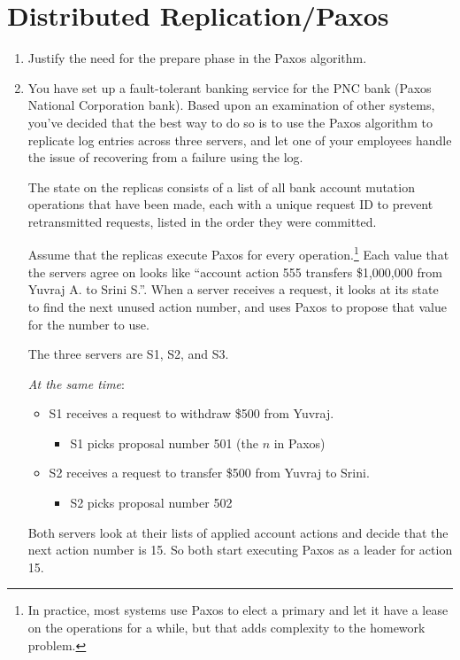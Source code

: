 \documentclass{article}
\begin{document}
\section{Distributed Replication/Paxos}
\begin{enumerate}
\item Justify the need for the prepare phase in the Paxos algorithm.
\item You have set up a fault-tolerant banking service for the PNC bank (Paxos National Corporation bank).  Based upon an examination of other systems, you've decided that the best way to do so is to use the Paxos algorithm to replicate log entries across three servers, and let one of your employees handle the issue of recovering from a failure using the log.

The state on the replicas consists of a list of all bank account
mutation operations that have been made,
each with a unique request ID to prevent retransmitted requests,
listed in the order they were committed.

Assume that the replicas execute Paxos for every
operation.\footnote{In practice, most systems use Paxos to elect a
  primary and let it have a lease on the operations for a while, but
  that adds complexity to the homework problem.}  Each value that the
servers agree on looks like ``account action 555 transfers \$1,000,000 from
Yuvraj A. to Srini S.''.  When a server receives a request, it looks at its state to find the next unused action number, and uses Paxos to propose that value for the number to use.

The three servers are S1, S2, and S3.

\emph{At the same time}:
\begin{itemize}
  \item S1 receives a request to withdraw \$500 from Yuvraj.
  \begin{itemize}
    \item S1 picks proposal number 501 (the $n$ in Paxos)
  \end{itemize}
  \item S2 receives a request to transfer \$500 from Yuvraj to Srini.
  \begin{itemize}
    \item S2 picks proposal number 502
  \end{itemize}
\end{itemize}

Both servers look at their lists of applied account actions and decide
that the next action number is 15. So both start executing Paxos as a
leader for action 15.\\


\end{enumerate}
\end{document}
